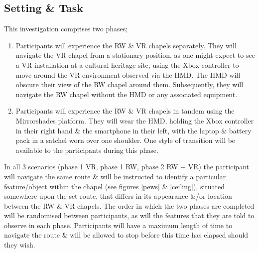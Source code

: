 
\subsection{Setting \& Task}
This investigation comprises two phases;

\begin{enumerate}
	\item Participants will experience the RW \& VR chapels separately. They will navigate the VR chapel from a stationary position, as one might expect to see a VR installation at a cultural heritage site, using the Xbox controller to move around the VR environment observed via the HMD. The HMD will obscure their view of the RW chapel around them. Subsequently, they will navigate the RW chapel without the HMD or any associated equipment.
	\item Participants will experience the RW \& VR chapels in tandem using the Mirrorshades platform. They will wear the HMD, holding the Xbox controller in their right hand \& the smartphone in their left, with the laptop \& battery pack in a satchel worn over one shoulder. One style of transition will be available to the participants during this phase.
\end{enumerate}

In all 3 scenarios (phase 1 VR, phase 1 RW, phase 2 RW + VR) the participant will navigate the same route \& will be instructed to identify a particular feature/object within the chapel (see figures \ref{pews} \& \ref{ceiling}), situated somewhere upon the set route, that differs in its appearance \&/or location between the RW \& VR chapels. The order in which the two phases are completed will be randomised between participants, as will the features that they are told to observe in each phase. Participants will have a maximum length of time to navigate the route \& will be allowed to stop before this time has elapsed should they wish.



